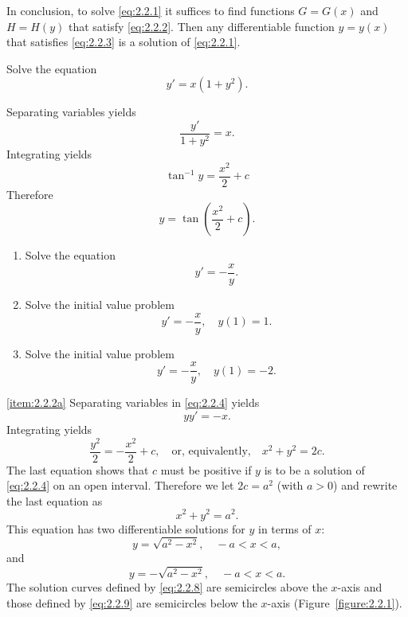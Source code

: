 \documentclass{ximera}
\begin{document}
In conclusion, to solve \eqref{eq:2.2.1} it suffices to find
functions $G=G(x)$ and $H=H(y)$ that satisfy \eqref{eq:2.2.2}.
Then any differentiable function  $y=y(x)$  that satisfies
\eqref{eq:2.2.3} is a solution of \eqref{eq:2.2.1}.

\begin{example}\label{example:2.2.1}
Solve the equation
$$
y'=x(1+y^2).
$$
\begin{explanation}
Separating variables
yields
$$
\frac{y'}{1+y^2}=x.
$$
Integrating yields
$$
\tan^{-1}y=\frac{x^2}{2}+c
$$
Therefore
$$
y=\tan\left(\frac{x^2}{2}+c\right).
$$
\end{explanation}
\end{example}

\begin{example}\label{example:2.2.2} 
\begin{enumerate}
\item\label{item:2.2.2a}
Solve the equation
\begin{equation} \label{eq:2.2.4}
y'=-\frac{x}{y}.
\end{equation}

\item\label{item:2.2.2b}
Solve the initial value problem
\begin{equation} \label{eq:2.2.5}
y'=-\frac{x}{y}, \quad y(1)=1.
\end{equation}

\item \label{item:2.2.2c}
Solve the initial value problem
\begin{equation} \label{eq:2.2.6}
y'=-\frac{x}{y}, \quad y(1)=-2.
\end{equation}
\end{enumerate}

\begin{explanation}
\ref{item:2.2.2a} Separating variables
in \eqref{eq:2.2.4}  yields
$$
yy'=-x.
$$
Integrating yields
$$
\frac{y^2}{2}=-\frac{x^2}{2}+c,\quad\text{or, equivalently,}\quad
x^2+y^2=2c.
$$
The last equation shows that $c$ must be positive if $y$ is to be a
solution of \eqref{eq:2.2.4} on an open interval. Therefore we let
$2c=a^2$ (with $a > 0$) and rewrite the last equation as
\begin{equation} \label{eq:2.2.7}
x^2+y^2=a^2.
\end{equation}
 This equation has two differentiable solutions for $y$ in terms of
$x$:
\begin{equation} \label{eq:2.2.8}
y=\sqrt{a^2-x^2}, \quad -a < x < a,
\end{equation}
 and
\begin{equation} \label{eq:2.2.9}
y= - \sqrt{a^2-x^2}, \quad -a < x < a.
\end{equation}
The solution curves defined by \eqref{eq:2.2.8}  are semicircles
above the
$x$-axis and  those defined by \eqref{eq:2.2.9}  are semicircles below the
$x$-axis (Figure~\ref{figure:2.2.1}).


\end{explanation}
\end{example}
\end{document}
